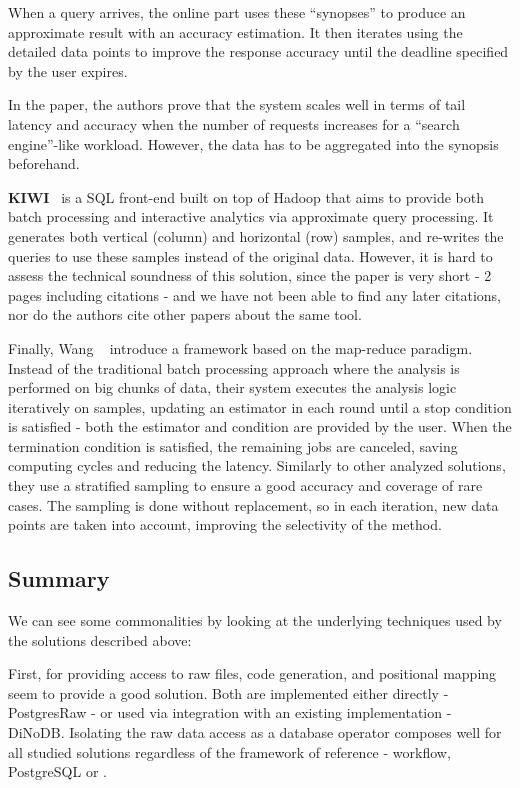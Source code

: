 When a query arrives, the online part uses these ``synopses'' to produce 
an approximate result with an accuracy estimation. It then iterates 
using the detailed data points to improve the response accuracy until the
deadline specified by the user expires.

In the paper, the authors prove that the system scales well in terms 
of tail latency and accuracy when the number of requests increases for a 
``search engine''-like workload. However, the data has to be aggregated into 
the synopsis beforehand.

\medskip

\textbf{KIWI}~\cite{Kim2015} is a SQL front-end built on top of Hadoop that aims 
to provide both batch processing and interactive analytics via approximate
query processing. It generates both vertical (column) and horizontal (row) 
samples, and re-writes the queries to use these samples instead of the original 
data. However, it is hard to assess the technical soundness of this 
solution, since the paper is very short - 2 pages including citations -
and we have not been able to find any later citations, nor do the authors cite 
other papers about the same tool.

\medskip

Finally, Wang \etal~\cite{WangYi2015} introduce a framework based on the 
map-reduce paradigm. Instead of the traditional batch processing approach 
where the analysis is performed on big chunks of data, their system executes the 
analysis logic iteratively on samples, updating an estimator in each round 
until a stop condition is satisfied - both the estimator and condition are provided by 
the user. When the termination condition is satisfied, the remaining jobs are 
canceled, saving computing cycles and reducing the latency. Similarly to other 
analyzed solutions, they use a stratified sampling to ensure a good accuracy and 
coverage of rare cases. 
The sampling is done without replacement, so in each iteration, new data points 
are taken into account, improving the selectivity of the method.


\subsection{Summary}
We can see some commonalities by looking at the underlying techniques used by the 
solutions described above:

First, for providing access to raw files, code generation, and positional 
mapping seem to provide a good solution. Both are implemented either directly - 
PostgresRaw - or used via integration with an existing implementation - DiNoDB. 
Isolating the raw data access as a database operator composes well for all 
studied solutions regardless of the framework of reference - workflow, 
PostgreSQL or \scidb.

